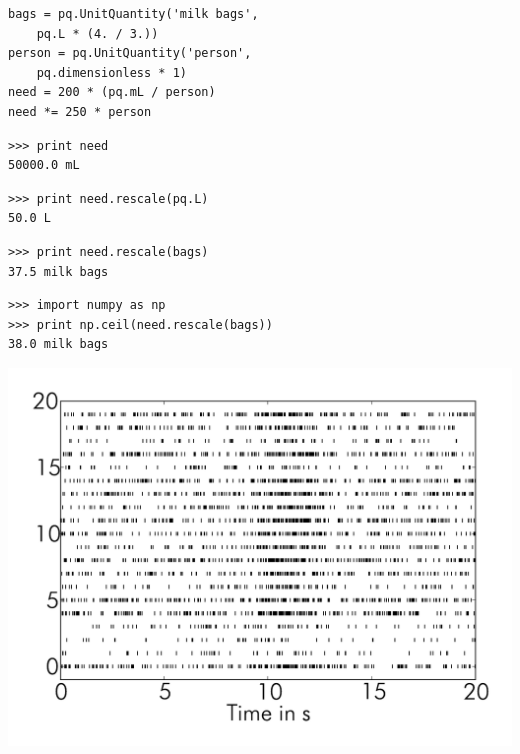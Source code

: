 \documentclass[17pt]{beamer}
\begin{document}
\begin{frame}[fragile]
  \vspace{-22pt}
  \begin{verbatim}
bags = pq.UnitQuantity('milk bags',
    pq.L * (4. / 3.))
person = pq.UnitQuantity('person',
    pq.dimensionless * 1)
need = 200 * (pq.mL / person)
need *= 250 * person
  \end{verbatim}
\end{frame}

\begin{frame}[fragile]
  \vspace{-8pt}
  \begin{verbatim}
>>> print need
50000.0 mL
  \end{verbatim}
  \pause
  \begin{verbatim}
>>> print need.rescale(pq.L)
50.0 L
  \end{verbatim}
  \pause
  \begin{verbatim}
>>> print need.rescale(bags)
37.5 milk bags
  \end{verbatim}
  \pause
  \begin{verbatim}
>>> import numpy as np
>>> print np.ceil(need.rescale(bags))
38.0 milk bags
  \end{verbatim}
\end{frame}

\begin{frame}
  \hspace*{-.055\columnwidth}
  \includegraphics[width=1.1\columnwidth]{spikes-1}
\end{frame}
\end{document}
